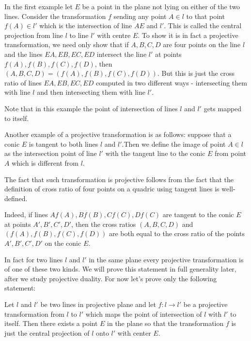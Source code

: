 In the first example let $E$ be a point in the plane not lying on either of the two lines. Consider the transformation $f$ sending any point $A\in l$ to that point $f(A)\in l'$ which is the intersection of line $AE$ and $l'$. This is called the central projection from line $l$ to line $l'$ with centre $E$. To show it is in fact a projective transformation, we need only show that if $A,B,C,D$ are four points on the line $l$ and the lines $EA,EB,EC,ED$ intersect the line $l'$ at points $f(A),f(B),f(C),f(D)$, then $(A,B,C,D)=(f(A),f(B),f(C),f(D))$. But this is just the cross ratio of lines $EA,EB,EC,ED$ computed in two different ways - intersecting them with line $l$ and then intersecting them with line $l'$.

Note that in this example the point of intersection of lines $l$ and $l'$ gets mapped to itself.

Another example of a projective transformation is as follows: suppose that a conic $E$ is tangent to both lines $l$ and $l'$.Then we define the image of point $A\in l$ as the intersection point of line $l'$ with the tangent line to the conic $E$ from point $A$ which is different from $l$.

The fact that such transformation is projective follows from the fact that the definition of cross ratio of four points on a quadric using tangent lines is well-defined.

Indeed, if lines $Af(A),Bf(B),Cf(C),Df(C)$ are tangent to the conic $E$ at points $A',B',C',D'$, then the cross ratios $(A,B,C,D)$ and $(f(A),f(B),f(C),f(D))$ are both equal to the cross ratio of the points $A',B',C',D'$ on the conic $E$.

In fact for two lines $l$ and $l'$ in the same plane every projective transformation is of one of these two kinds. We will prove this statement in full generality later, after we study projective duality. For now let's prove only the following statement:

\begin{theorem}
Let $l$ and $l'$ be two lines in projective plane and let $f:l\rightarrow l'$ be a projective transformation from $l$ to $l'$ which maps the point of intersection of $l$ with $l'$ to itself. Then there exists a point $E$ in the plane so that the transformation $f$ is just the central projection of $l$ onto $l'$ with center $E$.
\end{theorem}

